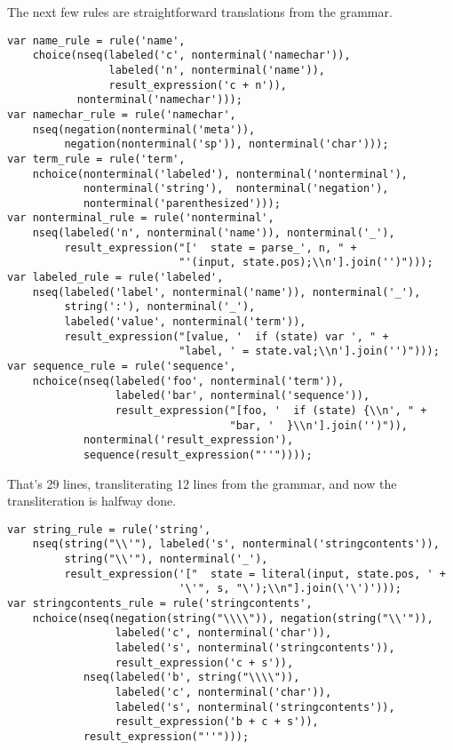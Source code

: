\documentclass[
]{article}
\begin{document}
The next few rules are straightforward translations from the grammar.

\begin{verbatim}
var name_rule = rule('name', 
    choice(nseq(labeled('c', nonterminal('namechar')),
                labeled('n', nonterminal('name')),
                result_expression('c + n')),
           nonterminal('namechar')));
var namechar_rule = rule('namechar',
    nseq(negation(nonterminal('meta')),
         negation(nonterminal('sp')), nonterminal('char')));
var term_rule = rule('term',
    nchoice(nonterminal('labeled'), nonterminal('nonterminal'), 
            nonterminal('string'),  nonterminal('negation'),
            nonterminal('parenthesized')));
var nonterminal_rule = rule('nonterminal',
    nseq(labeled('n', nonterminal('name')), nonterminal('_'),
         result_expression("['  state = parse_', n, " +
                           "'(input, state.pos);\\n'].join('')")));
var labeled_rule = rule('labeled',
    nseq(labeled('label', nonterminal('name')), nonterminal('_'),
         string(':'), nonterminal('_'),
         labeled('value', nonterminal('term')),
         result_expression("[value, '  if (state) var ', " +
                           "label, ' = state.val;\\n'].join('')")));
var sequence_rule = rule('sequence',
    nchoice(nseq(labeled('foo', nonterminal('term')),
                 labeled('bar', nonterminal('sequence')),
                 result_expression("[foo, '  if (state) {\\n', " +
                                   "bar, '  }\\n'].join('')")),
            nonterminal('result_expression'),
            sequence(result_expression("''"))));
\end{verbatim}

That's 29 lines, transliterating 12 lines from the grammar, and now the
transliteration is halfway done.

\begin{verbatim}
var string_rule = rule('string',
    nseq(string("\\'"), labeled('s', nonterminal('stringcontents')),
         string("\\'"), nonterminal('_'),
         result_expression('["  state = literal(input, state.pos, ' +
                           '\'", s, "\');\\n"].join(\'\')')));
var stringcontents_rule = rule('stringcontents',
    nchoice(nseq(negation(string("\\\\")), negation(string("\\'")),
                 labeled('c', nonterminal('char')),
                 labeled('s', nonterminal('stringcontents')),
                 result_expression('c + s')),
            nseq(labeled('b', string("\\\\")),
                 labeled('c', nonterminal('char')),
                 labeled('s', nonterminal('stringcontents')),
                 result_expression('b + c + s')),
            result_expression("''")));
\end{verbatim}
\end{document}
